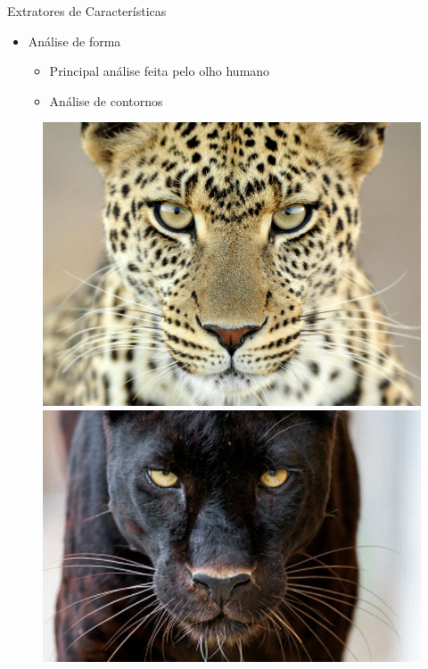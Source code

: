 \documentclass{beamer}
\begin{document}
\begin{frame}{Extratores de Características}
  \begin{itemize}
   \item Análise de forma\newline
   \begin{itemize}
      \item Principal análise feita pelo olho humano\newline
      \item Análise de contornos\newline
   \end{itemize}
   
  \end{itemize}
  	\begin{figure}
	    \centering
	    \begin{minipage}{.4\textwidth}
	      \centering
	      \includegraphics[width=.9\linewidth]{onca.jpg}
	    \end{minipage}%
	    \begin{minipage}{.4\textwidth}
	      \centering
	      \includegraphics[width=.9\linewidth]{pantera.jpg}
	    \end{minipage}
\end{figure}

\end{frame}
\end{document}
